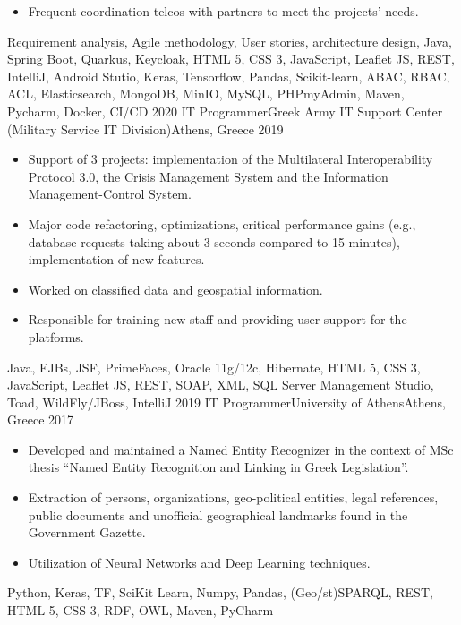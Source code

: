 \begin{experiences}
{\begin{itemize}
                        \item Frequent coordination telcos with partners to meet the projects' needs.

                    \end{itemize}
                    }
                    {Requirement analysis, Agile methodology, User stories, architecture design, Java, Spring Boot, Quarkus, Keycloak, HTML 5, CSS 3, JavaScript, Leaflet JS, REST, IntelliJ, Android Stutio, Keras, Tensorflow, Pandas, Scikit-learn, ABAC, RBAC, ACL, Elasticsearch, MongoDB, MinIO, MySQL, PHPmyAdmin, Maven, Pycharm, Docker, CI/CD}
  \emptySeparator
  \experience
    {2020}   {IT Programmer}{Greek Army IT Support Center (Military Service IT Division)}{Athens, Greece}
    {2019} {
                    \begin{itemize}
                      \item Support of 3 projects: implementation of the Multilateral Interoperability Protocol 3.0, the Crisis Management System
                      and the Information Management-Control System.

                      \item Major code refactoring, optimizations, critical performance gains (e.g., database requests taking about 3 seconds compared to 15 minutes), 
                      implementation of new features.

                      \item Worked on classified data and geospatial information.

                      \item Responsible for training new staff and providing user support for the platforms.
                    \end{itemize}
                    }
                    {Java, EJBs, JSF, PrimeFaces, Oracle 11g/12c, Hibernate, HTML 5, CSS 3, JavaScript, Leaflet JS, REST, SOAP, XML, SQL Server Management Studio, Toad, WildFly/JBoss, IntelliJ}
  \emptySeparator
  \experience
    {2019} {IT Programmer}{University of Athens}{Athens, Greece}
    {2017}    {
                    \begin{itemize}
                      \item Developed and maintained a Named Entity Recognizer in the context of MSc thesis ``Named Entity Recognition and Linking in Greek Legislation''.

                      \item Extraction of persons, organizations, geo-political entities, legal references, public documents and unofficial geographical landmarks found in the Government Gazette.

                      \item Utilization of Neural Networks and Deep Learning techniques.
                    \end{itemize}
                    }
                    {Python, Keras, TF, SciKit Learn, Numpy, Pandas, (Geo/st)SPARQL, REST, HTML 5, CSS 3, RDF, OWL, Maven, PyCharm}
\end{experiences}
